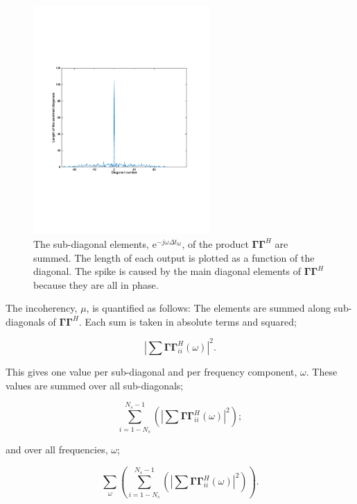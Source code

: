 \begin{figure}
	\centering
	\includegraphics[width=0.6\textwidth]{Plots/diagonal-sums}
	\caption{The sub-diagonal elements, $\mathrm{e}^{-j \omega \Delta t_{kl}}$, of the product $\mathbf{\Gamma \Gamma}^H$ are summed. The length of each output is plotted as a function of the diagonal. The spike is caused by the main diagonal elements of $\mathbf{\Gamma \Gamma}^H$ because they are all in phase.}
	\label{fig:Ch-Results-Diagonal-Sums}
\end{figure}

The incoherency, $\mu$, is quantified as follows: The elements are summed along sub-diagonals of $\mathbf{\Gamma \Gamma}^H$. Each sum is taken in absolute terms and squared;

\begin{equation}
	\left| \sum \mathbf{\Gamma \Gamma}^H_{ii} (\omega) \right|^2.
	\label{eq:Ch-Results-incoherency-diagsum}	
\end{equation}

This gives one value per sub-diagonal and per frequency component, $\omega$. These values are summed over all sub-diagonals;
 
 \begin{equation}
 	\sum_{i = 1-N_s}^{N_s-1}	 \left( \left| \sum \mathbf{\Gamma \Gamma}^H_{ii} (\omega) \right|^2 \right);
 	\label{eq:Ch-Results-incoherency-srcsum}
 \end{equation}
 
and over all frequencies, $\omega$;

\begin{equation}
	\sum_{\omega} \left( \sum_{i = 1-N_s}^{N_s-1}	 \left( \left| \sum \mathbf{\Gamma \Gamma}^H_{ii} (\omega) \right|^2 \right) \right).
	\label{eq:Ch-Results-incoherency-wsum}
\end{equation}

